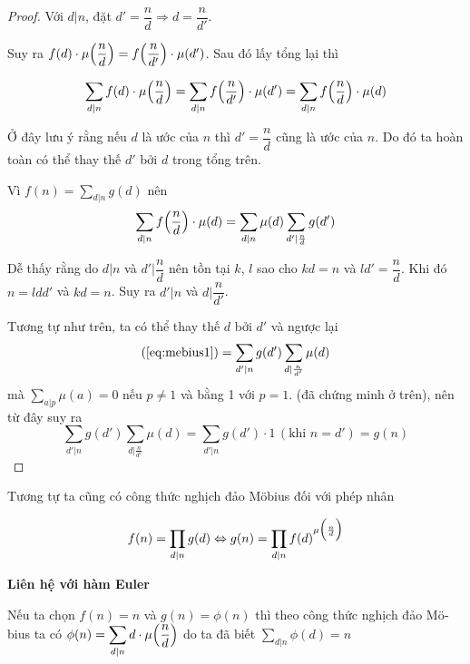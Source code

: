 \begin{proof}
    Với $d \vert n$, đặt $d' = \dfrac{n}{d} \Rightarrow d = \dfrac{n}{d'}$.

    Suy ra $f(d) \cdot \mu\Bigl(\dfrac{n}{d}\Bigr) = 
    f \Bigl(\dfrac{n}{d'}\Bigr) \cdot \mu(d')$.
    Sau đó lấy tổng lại thì

    \[\sum_{d \vert n} f(d) \cdot \mu \Bigl(\frac{n}{d}\Bigr) = 
    \sum_{d \vert n} f\Bigl(\frac{n}{d'}\Bigr) \cdot  \mu(d') = 
    \sum_{d \vert n} f\Bigl(\frac{n}{d}\Bigr) \cdot \mu(d)\]
    
    Ở đây lưu ý rằng nếu $d$ là ước của $n$ thì $d' = \dfrac{n}{d}$ cũng là
    ước của $n$. Do đó ta hoàn toàn có thể thay thế $d'$ bởi $d$ trong tổng trên.

    Vì $f(n) = \displaystyle{\sum_{d \vert n} g(d)}$ nên 
    \begin{equation}
        \label{eq:mebius1}
        \sum_{d \vert n} f\Bigl(\frac{n}{d}\Bigr) \cdot \mu(d)
    = \sum_{d \vert n} \mu(d) \sum_{d' \vert \frac{n}{d}} g(d')
    \end{equation}

    Dễ thấy rằng do $d \vert n$ và $d' \vert \dfrac{n}{d}$ nên tồn tại
    $k$, $l$ sao cho $kd = n$ và $ld' = \dfrac{n}{d}$. Khi đó $n = ldd'$ và $kd = n$.
    Suy ra $d' \vert n$ và $d \vert \dfrac{n}{d'}$.

    Tương tự như trên, ta có thể thay thế $d$ bởi $d'$ và ngược lại
    \[(\ref{eq:mebius1}) = \sum_{d' \vert n} g(d') \sum_{d \vert \frac{n}{d'}} \mu(d)\]
    mà $\displaystyle{\sum_{a \vert p} \mu(a) = 0}$ nếu $p \neq 1$ và bằng 1 với $p = 1$.
    (đã chứng minh ở trên), nên từ đây suy ra
    \[
        \sum_{d' \vert n} g(d') \sum_{d \vert \frac{n}{d'}} \mu(d)
        = \sum_{d' \vert n} g(d') \cdot 1 \,(\text{khi } n = d') = g(n)    
    \]
\end{proof}

Tương tự ta cũng có công thức nghịch đảo \foreignlanguage{german}{Möbius}
đối với phép nhân

\begin{equation}
    f(n) = \prod_{d \vert n} g(d) \Leftrightarrow 
    g(n) = \prod_{d \vert n} f(d)^{\mu\Bigl(\frac{n}{d}\Bigr)}
\end{equation}

\textbf{Liên hệ với hàm Euler}

Nếu ta chọn $f(n) = n$ và $g(n) = \phi(n)$ thì theo công thức nghịch đảo
\foreignlanguage{german}{Möbius} ta có
$\displaystyle{\phi(n) = \sum_{d \vert n} d \cdot \mu\Bigl(\frac{n}{d}\Bigr)}$
do ta đã biết $\displaystyle{\sum_{d \vert n} \phi(d) = n}$